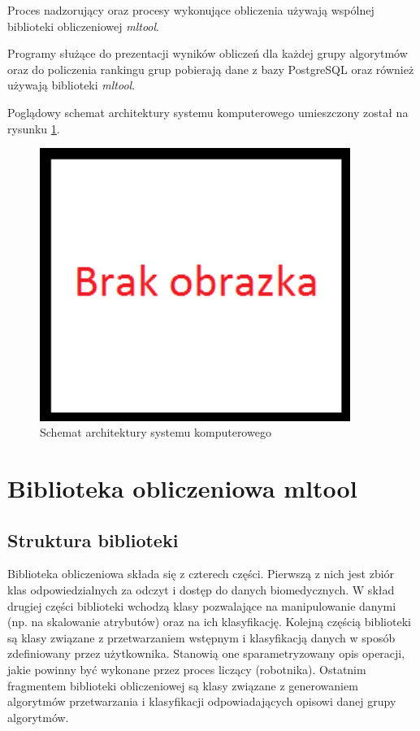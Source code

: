 \documentclass[../thesis.tex]{subfiles}
\begin{document}
Proces nadzorujący oraz procesy wykonujące obliczenia używają wspólnej biblioteki obliczeniowej \emph{mltool}. 

Programy służące do prezentacji wyników obliczeń dla każdej grupy algorytmów oraz do policzenia rankingu grup pobierają dane z bazy PostgreSQL oraz również używają biblioteki \emph{mltool}.

Poglądowy schemat architektury systemu komputerowego umieszczony został na rysunku \ref{proj:arch_diagram}.

\begin{figure}[h]
\centering
\includegraphics[width=0.9\textwidth]{missing.png}
\caption{Schemat architektury systemu komputerowego}
\label{proj:arch_diagram}
\end{figure}

\section{Biblioteka obliczeniowa mltool}

\subsection{Struktura biblioteki}
\label{proj:sec_structure}

Biblioteka obliczeniowa składa się z czterech części. Pierwszą z nich jest zbiór klas odpowiedzialnych za odczyt i dostęp do danych biomedycznych. W skład drugiej części biblioteki wchodzą klasy pozwalające na manipulowanie danymi (np. na skalowanie atrybutów) oraz na ich klasyfikację. Kolejną częścią biblioteki są klasy związane z przetwarzaniem wstępnym i klasyfikacją danych w sposób zdefiniowany przez użytkownika. Stanowią one sparametryzowany opis operacji, jakie powinny być wykonane przez proces liczący (robotnika). Ostatnim fragmentem biblioteki obliczeniowej są klasy związane z generowaniem algorytmów przetwarzania i klasyfikacji odpowiadających opisowi danej grupy algorytmów.
\end{document}
